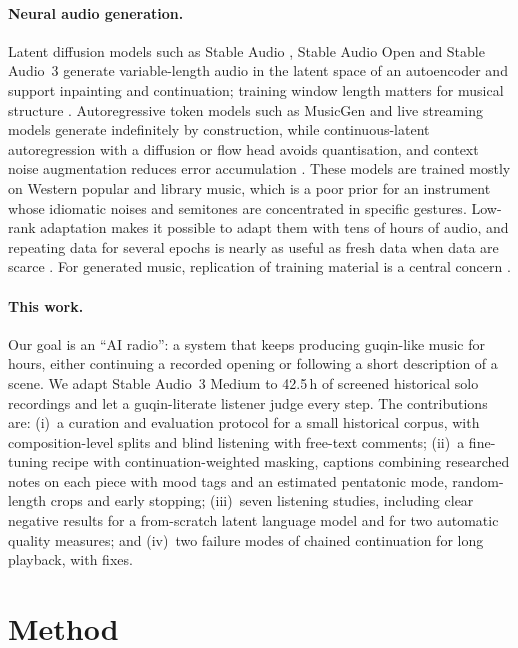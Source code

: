 \paragraph{Neural audio generation.} Latent diffusion models such as Stable Audio \citep{evans2024fast}, Stable Audio
Open \citep{evans2024open} and Stable Audio~3 \citep{evans2026stableaudio3} generate variable-length audio in the
latent space of an autoencoder and support inpainting and continuation; training window length matters for musical
structure \citep{evans2024longform}. Autoregressive token models such as MusicGen \citep{copet2023musicgen} and live
streaming models \citep{lyria2025live} generate indefinitely by construction, while continuous-latent autoregression
with a diffusion or flow head \citep{li2024mar} avoids quantisation, and context noise augmentation reduces error
accumulation \citep{pasini2024continuous}. These models are trained mostly on Western popular and library music,
which is a poor prior for an instrument whose idiomatic noises and semitones are concentrated in specific gestures.
Low-rank adaptation \citep{hu2021lora,liu2024dora} makes it possible to adapt them with tens of hours of audio, and
repeating data for several epochs is nearly as useful as fresh data when data are scarce
\citep{muennighoff2023scaling}. For generated music, replication of training material is a central concern
\citep{batlleroca2024replication}.

\paragraph{This work.} Our goal is an ``AI radio'': a system that keeps producing guqin-like music for hours, either
continuing a recorded opening or following a short description of a scene. We adapt Stable Audio~3 Medium to 42.5\,h
of screened historical solo recordings and let a guqin-literate listener judge every step. The contributions are:
(i)~a curation and evaluation protocol for a small historical corpus, with composition-level splits and blind
listening with free-text comments; (ii)~a fine-tuning recipe with continuation-weighted masking, captions combining
researched notes on each piece with mood tags and an estimated pentatonic mode, random-length crops and early
stopping; (iii)~seven listening studies, including clear negative results for a from-scratch latent language model
and for two automatic quality measures; and (iv)~two failure modes of chained continuation for long playback, with
fixes.

\section{Method}\label{sec:method}

